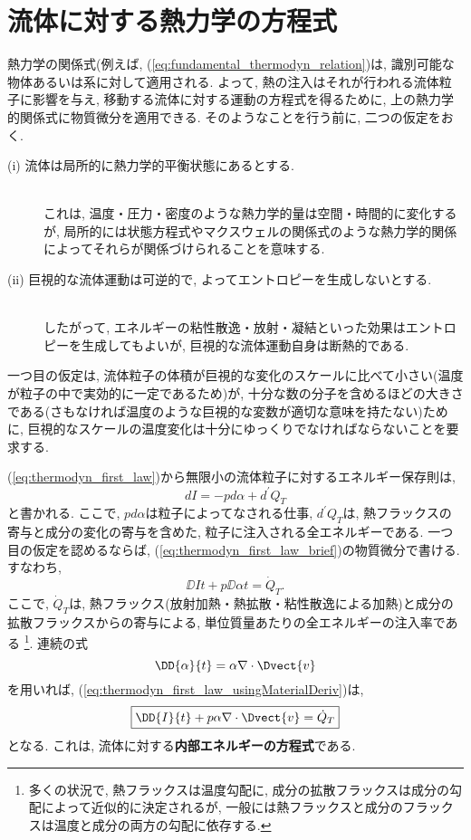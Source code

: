 \section{流体に対する熱力学の方程式}
熱力学の関係式(例えば, (\ref{eq:fundamental_thermodyn_relation})は, 識別可能な物体あるいは系に対して適用される. 
よって, 熱の注入はそれが行われる流体粒子に影響を与え, 
移動する流体に対する運動の方程式を得るために, 上の熱力学的関係式に物質微分を適用できる. 
そのようなことを行う前に, 二つの仮定をおく. 
\begin{description}
\item[(i) 流体は局所的に熱力学的平衡状態にあるとする.] \mbox{} \\
  これは, 温度・圧力・密度のような熱力学的量は空間・時間的に変化するが, 
  局所的には状態方程式やマクスウェルの関係式のような熱力学的関係によってそれらが関係づけられることを意味する. 
\item[(ii) 巨視的な流体運動は可逆的で, よってエントロピーを生成しないとする.] \mbox{} \\
  したがって, エネルギーの粘性散逸・放射・凝結といった効果はエントロピーを生成してもよいが, 
  巨視的な流体運動自身は断熱的である. 
\end{description}
一つ目の仮定は,  
流体粒子の体積が巨視的な変化のスケールに比べて小さい(温度が粒子の中で実効的に一定であるため)が, 
十分な数の分子を含めるほどの大きさである(さもなければ温度のような巨視的な変数が適切な意味を持たない)ために,
巨視的なスケールの温度変化は十分にゆっくりでなければならないことを要求する. 

(\ref{eq:thermodyn_first_law})から無限小の流体粒子に対するエネルギー保存則は, 
\begin{equation}
 dI = -pd\alpha + d^\prime Q_T
 \label{eq:thermodyn_first_law_brief}
\end{equation}
と書かれる. 
ここで, $pd\alpha$は粒子によってなされる仕事, 
$d^\prime Q_T$は, 熱フラックスの寄与と成分の変化の寄与を含めた, 粒子に注入される全エネルギーである. 
一つ目の仮定を認めるならば, (\ref{eq:thermodyn_first_law_brief})の物質微分で書ける. 
すなわち, 
\begin{equation}
 \DD{I}{t} + p\DD{\alpha}{t} = \dot{Q}_T. 
  \label{eq:thermodyn_first_law_usingMaterialDeriv}
\end{equation}
ここで, $\dot{Q}_T$は, 熱フラックス(放射加熱・熱拡散・粘性散逸による加熱)と成分の拡散フラックスからの寄与による, 
単位質量あたりの全エネルギーの注入率である %
\footnote{
多くの状況で, 熱フラックスは温度勾配に, 成分の拡散フラックスは成分の勾配によって近似的に決定されるが, 
一般には熱フラックスと成分のフラックスは温度と成分の両方の勾配に依存する. 
}. 
連続の式
\begin{equation*}
 \DD{\alpha}{t} = \alpha \nabla \cdot \Dvect{v}
\end{equation*}
を用いれば, (\ref{eq:thermodyn_first_law_usingMaterialDeriv})は, 
\begin{equation}
 \boxed{
 \DD{I}{t} + p\alpha \nabla \cdot \Dvect{v} = \dot{Q}_T
 \label{eq:internalEn_forFluid}
 }
\end{equation}
となる. 
これは, 流体に対する\textbf{内部エネルギーの方程式}である. 

